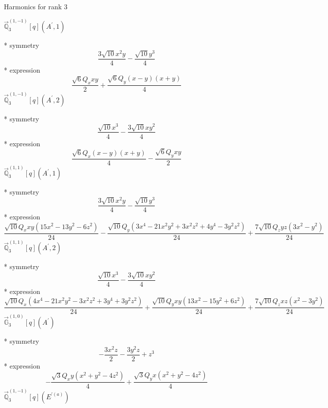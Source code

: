 \documentclass[fleqn,8pt]{jsarticle}
\begin{document}
\noindent * Harmonics for rank 3

\noindent\quad $\vec{\mathbb{Q}}_{3}^{(1,-1)}[q](A^{\prime},1)$

\noindent\quad ** symmetry
\begin{dmath*}
\frac{3 \sqrt{10} x^{2} y}{4} - \frac{\sqrt{10} y^{3}}{4}
\end{dmath*}
\noindent\quad ** expression
\begin{dmath*}
\frac{\sqrt{6} Q_{x} x y}{2} + \frac{\sqrt{6} Q_{y} \left(x - y\right) \left(x + y\right)}{4}
\end{dmath*}
\noindent\quad $\vec{\mathbb{Q}}_{3}^{(1,-1)}[q](A^{\prime},2)$

\noindent\quad ** symmetry
\begin{dmath*}
\frac{\sqrt{10} x^{3}}{4} - \frac{3 \sqrt{10} x y^{2}}{4}
\end{dmath*}
\noindent\quad ** expression
\begin{dmath*}
\frac{\sqrt{6} Q_{x} \left(x - y\right) \left(x + y\right)}{4} - \frac{\sqrt{6} Q_{y} x y}{2}
\end{dmath*}
\noindent\quad $\vec{\mathbb{Q}}_{3}^{(1,1)}[q](A^{\prime},1)$

\noindent\quad ** symmetry
\begin{dmath*}
\frac{3 \sqrt{10} x^{2} y}{4} - \frac{\sqrt{10} y^{3}}{4}
\end{dmath*}
\noindent\quad ** expression
\begin{dmath*}
\frac{\sqrt{10} Q_{x} x y \left(15 x^{2} - 13 y^{2} - 6 z^{2}\right)}{24} - \frac{\sqrt{10} Q_{y} \left(3 x^{4} - 21 x^{2} y^{2} + 3 x^{2} z^{2} + 4 y^{4} - 3 y^{2} z^{2}\right)}{24} + \frac{7 \sqrt{10} Q_{z} y z \left(3 x^{2} - y^{2}\right)}{24}
\end{dmath*}
\noindent\quad $\vec{\mathbb{Q}}_{3}^{(1,1)}[q](A^{\prime},2)$

\noindent\quad ** symmetry
\begin{dmath*}
\frac{\sqrt{10} x^{3}}{4} - \frac{3 \sqrt{10} x y^{2}}{4}
\end{dmath*}
\noindent\quad ** expression
\begin{dmath*}
\frac{\sqrt{10} Q_{x} \left(4 x^{4} - 21 x^{2} y^{2} - 3 x^{2} z^{2} + 3 y^{4} + 3 y^{2} z^{2}\right)}{24} + \frac{\sqrt{10} Q_{y} x y \left(13 x^{2} - 15 y^{2} + 6 z^{2}\right)}{24} + \frac{7 \sqrt{10} Q_{z} x z \left(x^{2} - 3 y^{2}\right)}{24}
\end{dmath*}
\noindent\quad $\vec{\mathbb{G}}_{3}^{(1,0)}[q](A^{\prime})$

\noindent\quad ** symmetry
\begin{dmath*}
- \frac{3 x^{2} z}{2} - \frac{3 y^{2} z}{2} + z^{3}
\end{dmath*}
\noindent\quad ** expression
\begin{dmath*}
- \frac{\sqrt{3} Q_{x} y \left(x^{2} + y^{2} - 4 z^{2}\right)}{4} + \frac{\sqrt{3} Q_{y} x \left(x^{2} + y^{2} - 4 z^{2}\right)}{4}
\end{dmath*}
\noindent\quad $\vec{\mathbb{Q}}_{3}^{(1,-1)}[q](E^{\prime(a)})$
\end{document}
